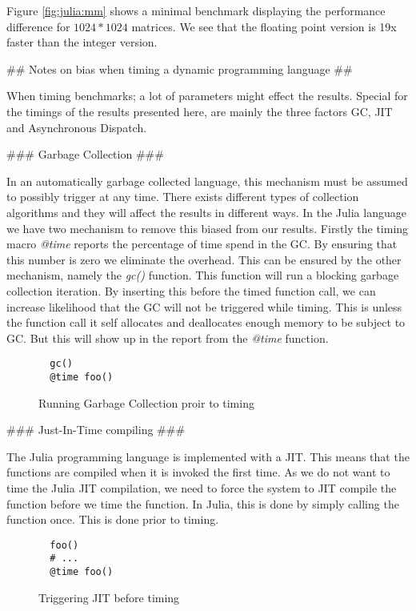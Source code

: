 \begin{markdown}
Figure \ref{fig:julia:mm} shows a minimal benchmark displaying the
performance difference for $1024*1024$ matrices. We see that the
floating point version is 19x faster than the integer version.


## Notes on bias when timing a dynamic programming language ##

When timing benchmarks; a lot of parameters might effect the
results. Special for the timings of the results presented here, are
mainly the three factors \gls{GC}, \gls{JIT} and Asynchronous
Dispatch.

### Garbage Collection ###

In an automatically garbage collected language, this mechanism must be
assumed to possibly trigger at any time. There exists different types
of collection algorithms and they will affect the results in different
ways. In the Julia language we have two mechanism to remove this
biased from our results. Firstly the timing macro \textit{@time}
reports the percentage of time spend in the \gls{GC}. By ensuring that
this number is zero we eliminate the overhead. This can be ensured by
the other mechanism, namely the \textit{gc()} function. This function will
run a blocking garbage collection iteration. By inserting this before
the timed function call, we can increase likelihood that the \gls{GC}
will not be triggered while timing. This is unless the function call
it self allocates and deallocates enough memory to be subject to
\gls{GC}. But this will show up in the report from the \textit{@time}
function.


\begin{figure}[H]
  \begin{verbatim}
  gc()
  @time foo()    
  \end{verbatim}
  \caption{Running Garbage Collection proir to timing}
\end{figure}

### Just-In-Time compiling ###

The Julia programming language is implemented with a \gls{JIT}. This
means that the functions are compiled when it is invoked the first
time. As we do not want to time the Julia \gls{JIT} compilation, we
need to force the system to \gls{JIT} compile the function before we
time the function. In Julia, this is done by simply calling the
function once. This is done prior to timing.

\begin{figure}[H]
  \begin{verbatim}
  foo()
  # ...
  @time foo()
  \end{verbatim}
  \caption{Triggering JIT before timing}
\end{figure}


\end{markdown}
